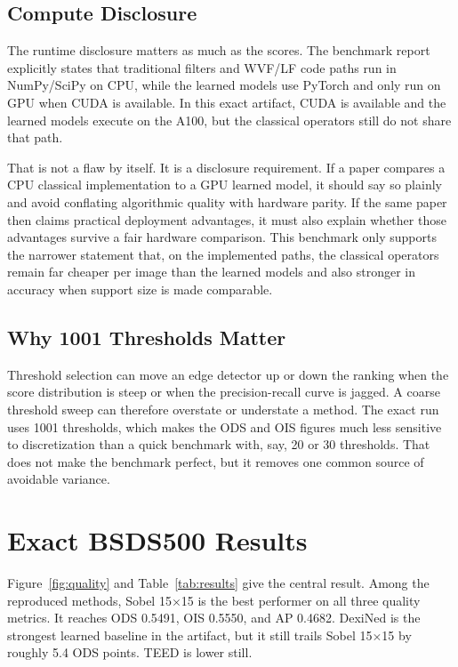 \documentclass[conference]{IEEEtran}
\begin{document}
\subsection{Compute Disclosure}
The runtime disclosure matters as much as the scores. The benchmark report explicitly states that traditional filters and WVF/LF code paths run in NumPy/SciPy on CPU, while the learned models use PyTorch and only run on GPU when CUDA is available. In this exact artifact, CUDA is available and the learned models execute on the A100, but the classical operators still do not share that path.

That is not a flaw by itself. It is a disclosure requirement. If a paper compares a CPU classical implementation to a GPU learned model, it should say so plainly and avoid conflating algorithmic quality with hardware parity. If the same paper then claims practical deployment advantages, it must also explain whether those advantages survive a fair hardware comparison. This benchmark only supports the narrower statement that, on the implemented paths, the classical operators remain far cheaper per image than the learned models and also stronger in accuracy when support size is made comparable.

\subsection{Why 1001 Thresholds Matter}
Threshold selection can move an edge detector up or down the ranking when the score distribution is steep or when the precision-recall curve is jagged. A coarse threshold sweep can therefore overstate or understate a method. The exact run uses 1001 thresholds, which makes the ODS and OIS figures much less sensitive to discretization than a quick benchmark with, say, 20 or 30 thresholds. That does not make the benchmark perfect, but it removes one common source of avoidable variance.

\section{Exact BSDS500 Results}
Figure~\ref{fig:quality} and Table~\ref{tab:results} give the central result. Among the reproduced methods, Sobel 15$\times$15 is the best performer on all three quality metrics. It reaches ODS 0.5491, OIS 0.5550, and AP 0.4682. DexiNed is the strongest learned baseline in the artifact, but it still trails Sobel 15$\times$15 by roughly 5.4 ODS points. TEED is lower still.
\end{document}
